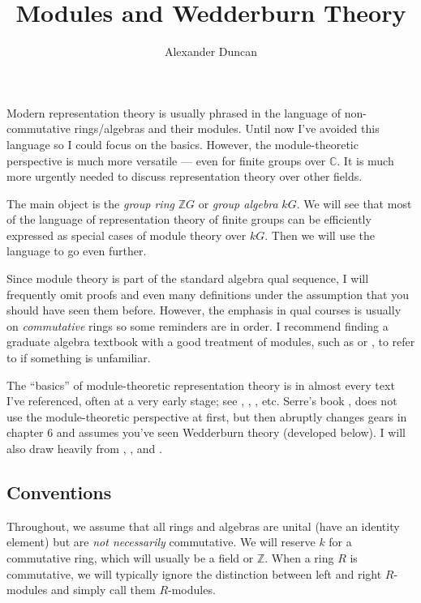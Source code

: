 \documentclass[12pt]{article}
\theoremstyle{plain}
\theoremstyle{definition}
\theoremstyle{remark}
\numberwithin{equation}{section}
\begin{document}
\title{Modules and Wedderburn Theory}
\author{Alexander Duncan}

\maketitle

Modern representation theory is usually phrased in the language of
non-commutative rings/algebras and their modules.
Until now I've avoided this language so I could focus on the basics.
However, the module-theoretic perspective is much more versatile --- even
for finite groups over $\mathbb{C}$.
It is much more urgently needed to discuss representation
theory over other fields. 

The main object is the \emph{group ring} $\mathbb{Z}G$
or \emph{group algebra} $kG$.  We will see that most of the language of
representation theory of finite groups can be efficiently expressed
as special cases of module theory over $kG$.
Then we will use the language to go even further.

Since module theory is part of the standard algebra qual sequence,
I will frequently omit proofs and even many definitions under the
assumption that you should have seen them before.
However, the emphasis in qual courses is usually on
\emph{commutative} rings so some reminders are in order.
I recommend finding a graduate algebra textbook with a good treatment of
modules, such as \cite[\S{10}]{DF} or \cite[\S{III}]{Lang},
to refer to if something is unfamiliar.

The ``basics'' of module-theoretic representation theory is in
almost every text I've referenced, often at a very early stage; 
see \cite{DF}, \cite{Etingof}, \cite{FultonHarris}, \cite{Lang} etc.
Serre's book \cite{Serre}, does not use the module-theoretic
perspective at first, but then abruptly changes gears in chapter 6 and
assumes you've seen Wedderburn theory (developed below).
I will also draw heavily from \cite[\S{12,13}]{AlperinBell},
\cite{AlperinLRT}, and \cite{CurtisReiner}.

\subsection*{Conventions}

Throughout, we assume that all rings and algebras are unital (have an identity
element) but are \emph{not necessarily} commutative.
We will reserve $k$ for a commutative ring, which will usually be a
field or $\mathbb{Z}$.
When a ring $R$ is commutative, we will typically ignore the
distinction between left and right $R$-modules and
simply call them $R$-modules.
\end{document}
